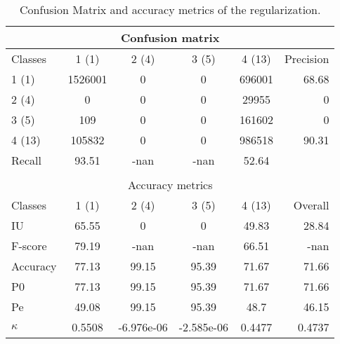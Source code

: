 \begin{table}
\begin{center}
\begin{tabular}{|l|c|c|c|c|r|}
\hline
\multicolumn{6}{|c|}{Confusion matrix} \\
\hline
 Classes & 1 (1) & 2 (4) & 3 (5) & 4 (13) & Precision \\
\hline
1 (1) & 1526001 & 0 & 0 & 696001 & 68.68 \\
\hline
2 (4) & 0 & 0 & 0 & 29955 & 0 \\
\hline
3 (5) & 109 & 0 & 0 & 161602 & 0 \\
\hline
4 (13) & 105832 & 0 & 0 & 986518 & 90.31 \\
\hline
Recall & 93.51 & -nan & -nan & 52.64 &  \\
\hline
\multicolumn{6}{c}{ } \\
\hline
\multicolumn{6}{|c|}{Accuracy metrics} \\
\hline
 Classes & 1 (1) & 2 (4) & 3 (5) & 4 (13) & Overall \\
\hline
IU & 65.55 & 0 & 0 & 49.83 & 28.84 \\
\hline
F-score & 79.19 & -nan & -nan & 66.51 & -nan \\
\hline
Accuracy & 77.13 & 99.15 & 95.39 & 71.67 & 71.66 \\
\hline
P0 & 77.13 & 99.15 & 95.39 & 71.67 & 71.66 \\
\hline
Pe & 49.08 & 99.15 & 95.39 & 48.7 & 46.15 \\
\hline
$\kappa$ & 0.5508 & -6.976e-06 & -2.585e-06 & 0.4477 & 0.4737 \\
\hline
\end{tabular}
\caption{Confusion Matrix and accuracy metrics of the regularization.}
\end{center}
\end{table}